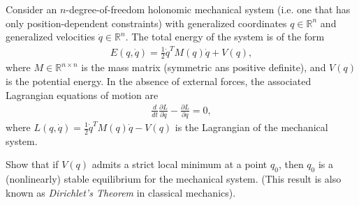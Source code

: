 \begin{exercise}
Consider an $n$-degree-of-freedom holonomic mechanical system (i.e. one that has only position-dependent constraints) with generalized coordinates $q\in \mathbb{R}^n$ and generalized velocities $\dot{q}\in \mathbb{R}^n$. The total energy of the system is of the form
\begin{align}
	E(q, \dot{q}) = \frac{1}{2} \dot{q}^T M(q)\dot{q} + V(q),
\end{align}
where $M \in \mathbb{R}^{n \times n}$ is the mass matrix (symmetric ans positive definite), and $V(q)$ is the potential energy. In the absence of external forces, the associated Lagrangian equations of motion are
\begin{align}
	\frac{d}{dt} \frac{\partial L}{\partial \dot{q}} - \frac{\partial L}{\partial q} = 0,
\end{align}
where $L(q, \dot{q}) = \frac{1}{2}\dot{q}^T M(q)\dot{q} - V(q)$ is the Lagrangian of the mechanical system.

Show that if $V(q)$ admits a strict local minimum at a point $q_0$, then $q_0$ is a (nonlinearly) stable equilibrium for the mechanical system. (This result is also known as \textit{Dirichlet's Theorem} in classical mechanics).

\end{exercise}
